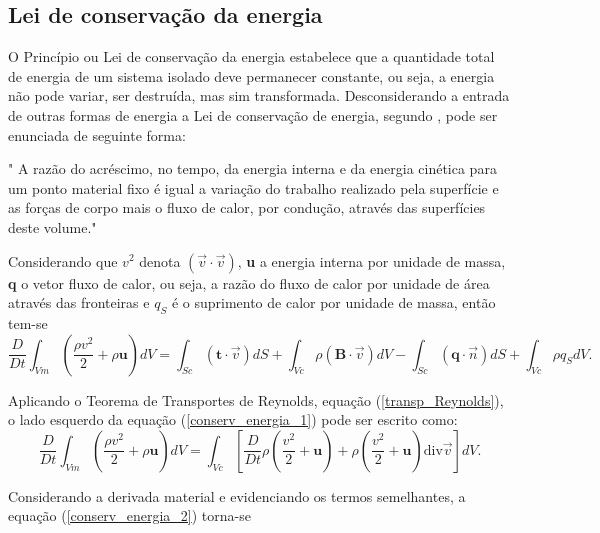 \subsection{Lei de conservação da energia}

O Princípio ou Lei de conservação da energia estabelece que a quantidade total de energia de um sistema isolado deve permanecer constante, ou seja, a energia não pode variar, ser destruída, mas sim transformada.
Desconsiderando a entrada de outras formas de energia a Lei de conservação de energia, segundo , pode ser enunciada de seguinte forma:

\begin{center}
 " A razão do acréscimo, no tempo, da energia interna e da energia cinética para um ponto material fixo é igual a variação do trabalho realizado pela superfície e as forças de corpo mais o fluxo de calor, por condução, através das superfícies deste volume." 
\end{center}
 
 Considerando que $ v^{ 2 }$   denota $ ( \vec{v} \cdot \vec{v} ) $, \textbf{u} a energia interna por unidade de massa, \textbf{q}  o vetor fluxo de calor, ou seja, a razão do fluxo de calor por unidade de área através das fronteiras e  $ q_{S} $ é o suprimento de calor por unidade de massa, então tem-se 
\begin{equation} \label{conserv_energia_1}
\dfrac{D}{Dt} \int_{Vm} \left( \dfrac{ \rho v^{2}}{2} + \rho \textbf{u} \right) dV = \int_{Sc} ( \textbf{t} \cdot \vec{v}) dS + \int_{Vc} \rho ( \textbf{B} \cdot \vec{v}) dV - \int_{Sc} ( \textbf{q} \cdot \vec{n}) dS + \int_{Vc} \rho q_{S} dV.
\end{equation}

Aplicando o Teorema de Transportes de Reynolds, equação (\ref{transp_Reynolds}), o lado esquerdo da equação (\ref{conserv_energia_1}) pode ser escrito como:
\begin{equation} \label{conserv_energia_2}
\dfrac{D}{Dt} \int_{Vm} \left( \dfrac{ \rho v^{2}}{2} + \rho \textbf{u} \right) dV = \int_{Vc} \left[ \dfrac{D}{Dt} \rho \left( \dfrac{v^{2}}{2} + \textbf{u} \right) + \rho \left( \dfrac{v^{2}}{2} + \textbf{u} \right) \mbox{div} \vec{v} \right] dV.
\end{equation}

Considerando a derivada material e evidenciando os termos semelhantes, a equação (\ref{conserv_energia_2}) torna-se

